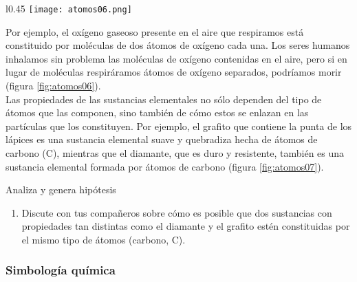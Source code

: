 \begin{wrapfigure}{l}{0.45\textwidth}
    \centering
    \texttt{[image: atomos06.png]}
    \label{fig:atomos06}
\end{wrapfigure}

Por ejemplo, el oxígeno gaseoso presente en el aire que respiramos
está constituido por moléculas de dos átomos de oxígeno cada una. Los seres
humanos inhalamos sin problema las moléculas de oxígeno contenidas en
el aire, pero si en lugar de moléculas respiráramos átomos de oxígeno separados, podríamos morir (figura \ref{fig:atomos06}).\\

Las propiedades de las sustancias elementales no sólo dependen del tipo de átomos que las componen, sino también
de cómo estos se enlazan en las partículas que los constituyen.
Por ejemplo, el grafito que contiene la punta de los lápices
es una sustancia elemental suave y quebradiza hecha de
átomos de carbono (C), mientras que el diamante, que es duro
y resistente, también es una sustancia elemental formada por
átomos de carbono (figura \ref{fig:atomos07}).\\

\begin{boxK}
    Analiza y genera hipótesis
    \begin{enumerate}
        \item Discute con tus compañeros sobre cómo es posible que
              dos sustancias con propiedades tan distintas como el
              diamante y el grafito estén constituidas por el mismo
              tipo de átomos (carbono, C).
    \end{enumerate}
\end{boxK}

\subsubsection{Simbología química}

